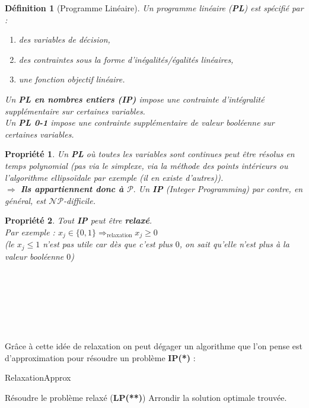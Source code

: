 \documentclass{article}
\newcommand{\titre}[1]{\textcolor{title}{#1}}
\newtheorem{de}{D\'efinition}[section]
\newtheorem{propriete}{Propri\'et\'e}[section]
\begin{document}
\begin{sffamily}
\begin{de}[Programme Linéaire]
Un programme linéaire (\titre{\textbf{PL}}) est spécifié par :
\begin{enumerate}
\item des variables de décision,
\item des contraintes sous la forme d'inégalités/égalités linéaires,
\item une fonction objectif linéaire.
\end{enumerate}
Un \textbf{\titre{PL} en nombres entiers (\titre{IP})} impose une contrainte d'intégralité supplémentaire sur certaines variables.\\
Un \textbf{\titre{PL} 0-1} impose une contrainte supplémentaire de valeur booléenne sur certaines variables.\\
\end{de}
\begin{propriete}
Un \textbf{\titre{PL}} où toutes les variables sont continues peut être résolus en temps polynomial (pas via le simplexe, via la méthode 
des points intérieurs ou l'algorithme ellipsoïdale par exemple (il en existe d'autres)).\\ 
\indent $\Rightarrow$ \textbf{Ils appartiennent donc à $\mathcal{P}.$} Un \textbf{\titre{IP}} \textit{(Integer Programming)} par contre, 
en général, est $\mathcal{NP}$-\textit{difficile}.
\end{propriete}

\begin{propriete}
Tout \textbf{\titre{IP}} peut être \textbf{relaxé}. \\
Par exemple : $x_j \in \{0,1\} \Rightarrow_{\text{relaxation}} x_j \geq 0$\\
(le $x_j \leq 1$ n'est pas utile car dès que c'est plus $0$, on sait qu'elle n'est plus à la valeur booléenne $0$)
\end{propriete}
$ $\\$ $\\$ $\\$ $\\$ $\\$ $\\

Grâce à cette idée de relaxation on peut dégager un algorithme que l'on pense est d'approximation pour résoudre un problème 
\textbf{IP(*)} :
\begin{algorithm}[h!]
\caption{RelaxationApprox}
\begin{algorithmic}[1]
\STATE Résoudre le problème relaxé (\textbf{LP(**)})
\STATE Arrondir la solution optimale trouvée.
\end{algorithmic}
\end{algorithm}


\end{sffamily}
\end{document}
